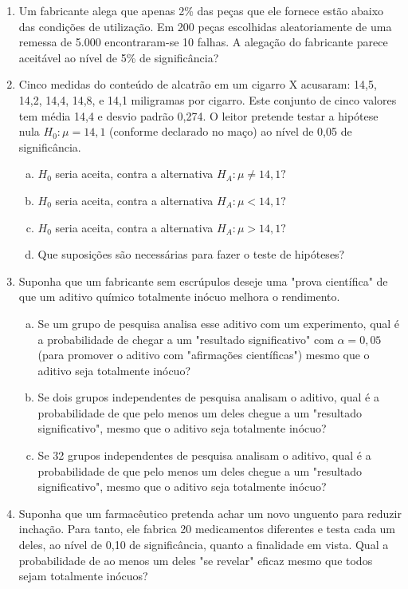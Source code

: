 \documentclass[12pt, a4paper]{article}
\begin{document}
\begin{enumerate}
\item Um fabricante alega que apenas 2\% das peças que ele fornece estão abaixo das condições de utilização. Em 200 peças escolhidas aleatoriamente de uma remessa de 5.000 encontraram-se 10 falhas. A alegação do fabricante parece aceitável ao nível de 5\% de significância?

\item Cinco medidas do conteúdo de alcatrão em um cigarro X acusaram: 14,5, 14,2, 14,4, 14,8, e 14,1 miligramas por cigarro. Este conjunto de cinco valores tem média 14,4 e desvio padrão 0,274. O leitor pretende testar a hipótese nula $H_0: \mu=14,1$ (conforme declarado no maço) ao nível de 0,05 de significância.
\begin{enumerate}[a)]
    \item $H_{0}$ seria aceita, contra a alternativa $H_{A}: \mu \neq 14,1?$
    \item $H_{0}$ seria aceita, contra a alternativa $H_{A}: \mu < 14,1?$
    \item $H_{0}$ seria aceita, contra a alternativa $H_{A}: \mu > 14,1?$
    \item Que suposições são necessárias para fazer o teste de hipóteses?
\end{enumerate}

\item Suponha que um fabricante sem escrúpulos deseje uma "prova científica" de que um aditivo químico totalmente inócuo melhora o rendimento.
\begin{enumerate}[a)]
    \item Se um grupo de pesquisa analisa esse aditivo com um experimento, qual é a probabilidade de chegar a um "resultado significativo" com $\alpha=0,05$ (para promover o aditivo com "afirmações científicas") mesmo que o aditivo seja totalmente inócuo?
    \item Se dois grupos independentes de pesquisa analisam o aditivo, qual é a probabilidade de que pelo menos um deles chegue a um "resultado significativo", mesmo que o aditivo seja totalmente inócuo?
    \item Se 32 grupos independentes de pesquisa analisam o aditivo, qual é a probabilidade de que pelo menos um deles chegue a um "resultado significativo", mesmo que o aditivo seja totalmente inócuo?
\end{enumerate}

\item Suponha que um farmacêutico pretenda achar um novo unguento para reduzir inchação. Para tanto, ele fabrica 20 medicamentos diferentes e testa cada um deles, ao nível de 0,10 de significância, quanto a finalidade em vista. Qual a probabilidade de ao menos um deles "se revelar" eficaz mesmo que todos sejam totalmente inócuos?


\end{enumerate}
\end{document}
